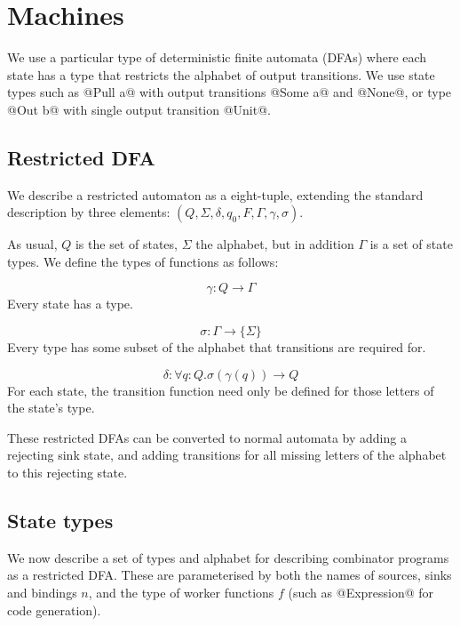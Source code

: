 \section{Machines}
\label{s:Machines}

We use a particular type of deterministic finite automata (DFAs) where each state has a type that restricts the alphabet of output transitions.
We use state types such as @Pull a@ with output transitions @Some a@ and @None@, or type @Out b@ with single output transition @Unit@.

\subsection{Restricted DFA}

We describe a restricted automaton as a eight-tuple, extending the standard description by three elements: $(Q, \Sigma, \delta, q_0, F, \Gamma, \gamma, \sigma)$.

As usual, $Q$ is the set of states, $\Sigma$ the alphabet, but in addition $\Gamma$ is a set of state types.
We define the types of functions as follows:

\[ \gamma : Q \to \Gamma \]
Every state has a type.

\[ \sigma : \Gamma \to \{ \Sigma \} \]
Every type has some subset of the alphabet that transitions are required for.

\[ \delta : \forall q : Q. \sigma(\gamma(q)) \to Q \]
For each state, the transition function need only be defined for those letters of the state's type.

These restricted DFAs can be converted to normal automata by adding a rejecting sink state, and adding transitions for all missing letters of the alphabet to this rejecting state.

\subsection{State types}
We now describe a set of types and alphabet for describing combinator programs as a restricted DFA.
These are parameterised by both the names of sources, sinks and bindings $n$, and the type of worker functions $f$ (such as @Expression@ for code generation).

